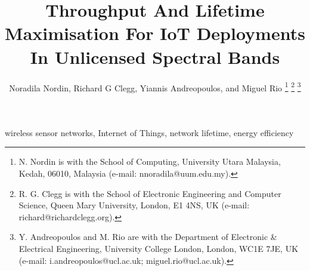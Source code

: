 \documentclass[journal]{IEEEtran}
\begin{document}
\title{Throughput And Lifetime Maximisation For IoT Deployments In Unlicensed Spectral Bands}

\author{Noradila Nordin,
        Richard G Clegg,
        Yiannis Andreopoulos,
        and Miguel Rio%
\thanks{N. Nordin is with the School of Computing, University Utara Malaysia, Kedah, 06010, Malaysia (e-mail: nnoradila@uum.edu.my).}
\thanks{R. G. Clegg is with the School of Electronic Engineering and Computer Science, Queen Mary University, London, E1 4NS, UK (e-mail: richard@richardclegg.org).}%
\thanks{Y. Andreopoulos and M. Rio are with the Department
of Electronic \& Electrical Engineering, University College London, London,
WC1E 7JE, UK (e-mail: i.andreopoulos@ucl.ac.uk; miguel.rio@ucl.ac.uk).}%
}



\maketitle




\begin{IEEEkeywords}
wireless sensor networks, Internet of Things, network lifetime, energy efficiency
\end{IEEEkeywords}

\IEEEpeerreviewmaketitle




%




%




\label{references}


\end{document}
